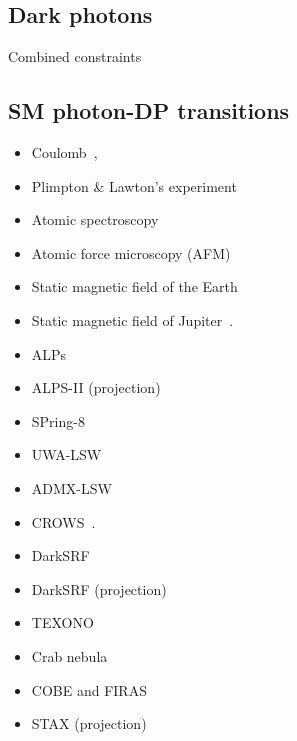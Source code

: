 \documentclass[8pt,twocolumn]{extarticle}
\begin{document}
\begin{mdframed}
\section{Dark photons}\vspace{-0.5em}
Combined constraints~\cite{Caputo:2021eaa}
\subsection*{SM photon-DP transitions}\vspace{-0.5em}
\begin{itemize}\setlength\itemsep{-0.5em}
\item Coulomb~\cite{Goldhaber:2008xy,Williams:1971ms,Bartlett:1988yy,Tu:2005ge,Kroff:2020zhp},
\item Plimpton \& Lawton's experiment~\cite{Plimpton:1936ont,Kroff:2020zhp}
\item Atomic spectroscopy~\cite{Jaeckel:2010xx}
\item Atomic force microscopy (AFM)~\cite{Kroff:2020zhp}
\item Static magnetic field of the Earth~\cite{Goldhaber:1971mr,Fischbach:1994ir,Marocco:2021dku}
\item Static magnetic field of Jupiter~\cite{Davis:1975mn,Marocco:2021dku}. 
\item ALPs~\cite{Ehret:2010mh}
\item ALPS-II (projection)~\cite{Bahre:2013ywa}
\item SPring-8~\cite{Inada:2013tx}
\item UWA-LSW~\cite{Povey:2010hs,Parker:2013fxa}
\item ADMX-LSW~\cite{Wagner:2010mi}
\item CROWS~\cite{Betz:2013dza}.
\item DarkSRF~\cite{Romanenko:2023irv}
\item DarkSRF (projection)~\cite{Berlin:2022hfx}
\item TEXONO~\cite{Danilov:2018bks}
\item Crab nebula~\cite{Zechlin:2008tj}
\item COBE and FIRAS~\cite{Caputo:2020bdy}
\item STAX (projection)~\cite{Miyazaki:2022kxl}
\end{itemize}



\end{mdframed}
\end{document}
